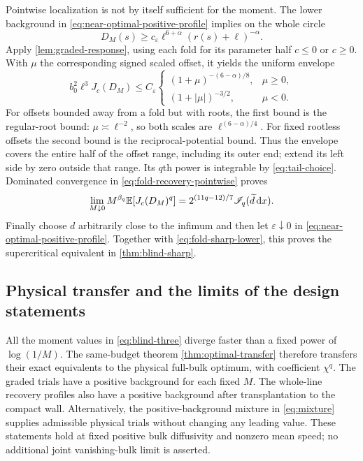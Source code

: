 Pointwise localization is not by itself sufficient for the moment.
The lower background in \eqref{eq:near-optimal-positive-profile}
implies on the whole circle
\[
 D_M(s)\ge c_\varepsilon\ell^{6+\alpha}(r(s)+\ell)^{-\alpha}.
\]
Apply \cref{lem:graded-response}, using each fold for its parameter
half $c\le0$ or $c\ge0$. With $\mu$ the corresponding signed scaled
offset, it yields the uniform envelope
\begin{equation}\label{eq:recovery-global-envelope}
 b_0^2\ell^3J_c(D_M)\le C_\varepsilon
 \begin{cases}
 (1+\mu)^{-(6-\alpha)/8},&\mu\ge0,\\
 (1+|\mu|)^{-3/2},&\mu<0.
 \end{cases}
\end{equation}
For offsets bounded away from a fold but with roots, the first bound
is the regular-root bound: $\mu\asymp\ell^{-2}$, so both scales are
$\ell^{(6-\alpha)/4}$. For fixed rootless offsets the second bound
is the reciprocal-potential bound. Thus the envelope covers the
entire half of the offset range, including its outer end; extend
its left side by zero outside that range. Its $q$th power is
integrable by \eqref{eq:tail-choice}. Dominated convergence in
\eqref{eq:fold-recovery-pointwise} proves
\[
 \lim_{M\downarrow0}M^{\beta_q}\mathbb E[J_c(D_M)^q]
       =2^{(11q-12)/7}\mathscr I_q(\widetilde d\,\mathrm d x).
\]
Finally choose $d$ arbitrarily close to the infimum and then let
$\varepsilon\downarrow0$ in \eqref{eq:near-optimal-positive-profile}.
Together with \eqref{eq:fold-sharp-lower}, this proves the
supercritical equivalent in \cref{thm:blind-sharp}.

\subsection{Physical transfer and the limits of the design statements}
All the moment values in \eqref{eq:blind-three} diverge faster than
a fixed power of $\log(1/M)$. The same-budget theorem
\cref{thm:optimal-transfer} therefore transfers their exact equivalents
to the physical full-bulk optimum, with coefficient $\chi^q$.
The graded trials have a positive background for each fixed $M$.
The whole-line recovery profiles also have a positive background
after transplantation to the compact wall. Alternatively, the
positive-background mixture in \eqref{eq:mixture} supplies admissible
physical trials without changing any leading value. These statements
hold at fixed positive bulk diffusivity and nonzero mean speed;
no additional joint vanishing-bulk limit is asserted.

